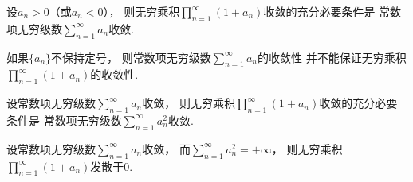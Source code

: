 \begin{corollary}\label{theorem:无穷乘积.无穷乘积收敛性与无穷级数收敛性的联系.推论1}
设\(a_n>0\)（或\(a_n<0\)），
则无穷乘积\(\prod_{n=1}^\infty (1+a_n)\)收敛的充分必要条件是
常数项无穷级数\(\sum_{n=1}^\infty a_n\)收敛.
\end{corollary}
\begin{remark}
如果\(\{a_n\}\)不保持定号，
则常数项无穷级数\(\sum_{n=1}^\infty a_n\)的收敛性
并不能保证无穷乘积\(\prod_{n=1}^\infty (1+a_n)\)的收敛性.
\end{remark}

\begin{corollary}\label{theorem:无穷乘积.无穷乘积收敛性与无穷级数收敛性的联系.推论2}
设常数项无穷级数\(\sum_{n=1}^\infty a_n\)收敛，
则无穷乘积\(\prod_{n=1}^\infty (1+a_n)\)收敛的充分必要条件是
常数项无穷级数\(\sum_{n=1}^\infty a_n^2\)收敛.
\end{corollary}
\begin{proposition}
设常数项无穷级数\(\sum_{n=1}^\infty a_n\)收敛，
而\(\sum_{n=1}^\infty a_n^2 = +\infty\)，
则无穷乘积\(\prod_{n=1}^\infty (1+a_n)\)发散于\(0\).
\end{proposition}
